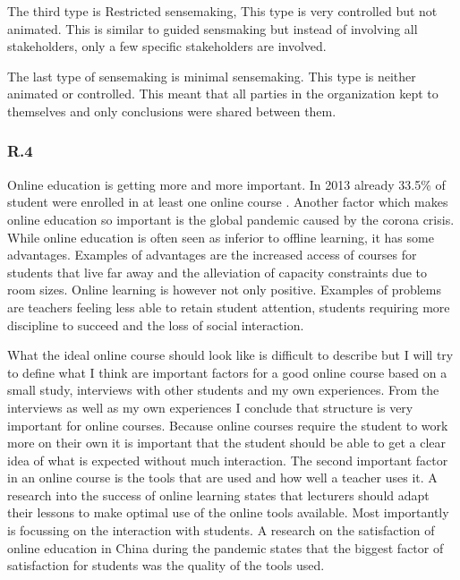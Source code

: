 \documentclass[]{article}
\begin{document}
The third type is Restricted sensemaking, 
This type is very controlled but not animated. 
This is similar to guided sensmaking but instead of involving all stakeholders, 
only a few specific stakeholders are involved.

The last type of sensemaking is minimal sensemaking.
This type is neither animated or controlled. This meant that all parties 
in the organization kept to themselves and only conclusions were shared between them.


\subsubsection*{R.4}
Online education is getting more and more important. In 2013 already 33.5\% of 
student were enrolled in at least one online course \cite{allen2014grade}. Another 
factor which makes online education so important is the global pandemic caused by 
the corona crisis. While online education is often seen as inferior to offline learning,
it has some advantages. Examples of advantages are the increased access of courses 
for students that live far away and the alleviation of capacity constraints due to 
room sizes\cite{volery2000critical}. Online learning is however not only positive.
Examples of problems are teachers feeling less able to retain student attention,
students requiring more discipline to succeed and the loss of social interaction\cite{allen2014grade}.

What the ideal online course should look like is difficult to describe but I will 
try to define what I think are important factors for a good online course based on 
a small study, interviews with other students and my own experiences. 
From the interviews as well as my own experiences I conclude that structure is very 
important for online courses. Because online courses require the student to work 
more on their own it is important that the student should be able to get a clear 
idea of what is expected without much interaction. The second important factor in an 
online course is the tools that are used and how well a teacher uses it. A research 
into the success of online learning\cite{volery2000critical} states that lecturers should
adapt their lessons to make optimal use of the online tools available. Most importantly 
is focussing on the interaction with students. A research on the satisfaction of 
online education in China during the pandemic\cite{chen2020analysis} states that 
the biggest factor of satisfaction for students was the quality of the tools used.
\end{document}
